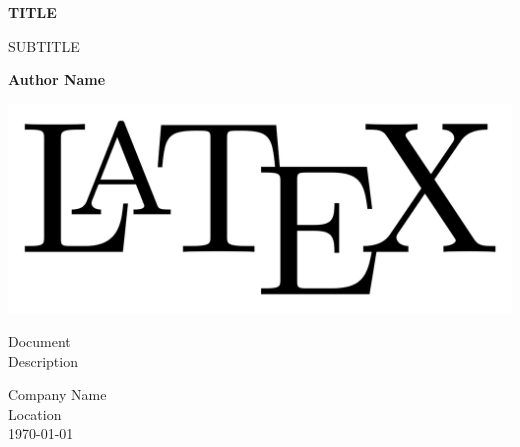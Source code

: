\documentclass[../subfiles-collections/main-document.tex]{subfiles}
\begin{document}
\begin{titlepage}
    \begin{center}
        \vspace*{1cm}

        \begin{Huge}
            \textbf{TITLE}
        \end{Huge}

        \vspace{0.5cm}

        SUBTITLE

        \vspace{1.5cm}

        \textbf{Author Name}

        \vspace{0.8cm}     

        \includegraphics[width=\textwidth, keepaspectratio]{../pics/latex.png}

        \vfill      

        Document\\
        Description   

        \vspace{0.8cm} 

        Company Name\\
        Location\\
        \today           
    \end{center}
\end{titlepage}
\end{document}
